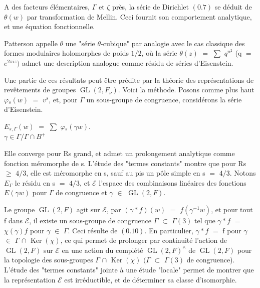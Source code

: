 \documentclass[10pt,a4paper]{article}
\begin{document}
\clearpage
{}
\label{d035-physical-006}
\par A des facteurs élémentaires, $\Gamma{}$ et $\zeta{}$ près, la série de Dirichlet $(0.7)$ se déduit de $\theta{}(w)$ par transformation de Mellin. Ceci fournit son comportement analytique, et une équation fonctionnelle.\par
\par Patterson appelle $\theta{}$ une "série $\theta{}$-cubique" par analogie avec le cas classique des formes modulaires holomorphes de poids $1/2$, où la série $\theta{}(z)$ $=$ $\sum{}$ $q^{n^{2}}$ (q $=$ $e^{2\pi{}iz})$ admet une description analogue comme résidu de séries d'Eisenstein.\par
\par Une partie de ces résultats peut être prédite par la théorie des représentations de revêtements de groupes $\operatorname{GL}(2,F_\nu{})$. Voici la méthode. Posons comme plus haut $\varphi{}_s(w)$ $=$ $v^s$, et, pour $\Gamma{}$ un sous-groupe de congruence, considérons la série d'Eisenstein.\par
\par\smallskip\begin{center}\begin{minipage}{0.96\textwidth}\centering
$E_{s,\Gamma{}}(w)$ $=$ $\sum{}$ $\varphi{}_s(\gamma{}w)$. \\ $\gamma{}\in{}\Gamma{}/\Gamma{}\cap{}B^+$
\end{minipage}\end{center}\smallskip
\par Elle converge pour Rs grand, et admet un prolongement analytique comme fonction méromorphe de s. L'étude des "termes constants" montre que pour Rs $\ge{}$ $4/3$, elle est méromorphe en s, sauf au pis un pôle simple en s $=$ $4/3$. Notons $E_\Gamma{}$ le résidu en s $=$ $4/3$, et $\mathcal{E}$ l'espace des combinaisons linéaires des fonctions $E(\gamma{}w)$ pour $\Gamma{}$ de congruence et $\gamma{}$ $\in{}$ $\operatorname{GL}(2,F)$.\par
\par Le groupe $\operatorname{GL}(2,F)$ agit sur $\mathcal{E}$, par $(\gamma{}*f)(w)$ $=$ $f(\gamma{}^{-1}w)$, et pour tout f dans $\mathcal{E}$, il existe un sous-groupe de congruence $\Gamma{}$ $\subset{}$ $\Gamma{}(3)$ tel que $\gamma{}*f$ $=$ $\chi{}(\gamma{})f$ pour $\gamma{}$ $\in{}$ $\Gamma{}$. Ceci résulte de $(0.10)$. En particulier, $\gamma{}*f$ $=$ f pour $\gamma{}$ $\in{}$ $\Gamma{}$ $\cap{}$ $\operatorname{Ker}(\chi{})$, ce qui permet de prolonger par continuité l'action de $\operatorname{GL}(2,F)$ sur $\mathcal{E}$ en une action du complété $\operatorname{GL}(2,F)^\wedge{}$ de $\operatorname{GL}(2,F)$ pour la topologie des sous-groupes $\Gamma{}$ $\cap{}$ $\operatorname{Ker}(\chi{})$ $(\Gamma{}$ $\subset{}$ $\Gamma{}(3)$ de congruence). L'étude des "termes constants" jointe à une étude "locale" permet de montrer que la représentation $\mathcal{E}$ est irréductible, et de déterminer sa classe d'isomorphie.\par
\end{document}
